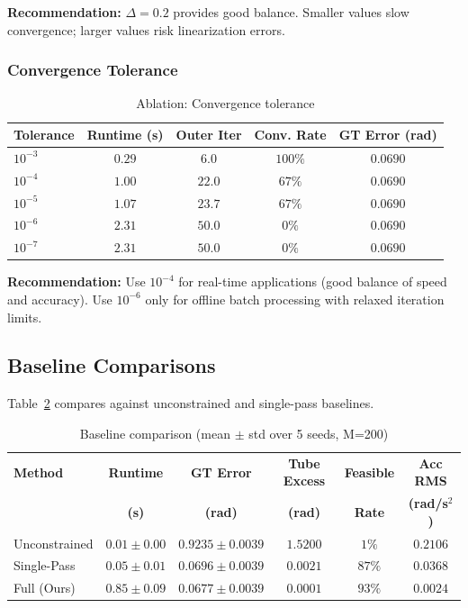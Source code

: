 \textbf{Recommendation:} $\Delta = 0.2$ provides good balance. Smaller values slow convergence; larger values risk linearization errors.

\subsubsection{Convergence Tolerance}

\begin{table}[htbp]
\centering
\caption{Ablation: Convergence tolerance}
\label{tab:ablation_tolerance}
\begin{tabular}{l c c c c}
\hline
\textbf{Tolerance} & \textbf{Runtime (s)} & \textbf{Outer Iter} & \textbf{Conv. Rate} & \textbf{GT Error (rad)} \\
\hline
$10^{-3}$ & $0.29$ & $6.0$ & $100\%$ & $0.0690$ \\
$10^{-4}$ & $1.00$ & $22.0$ & $67\%$ & $0.0690$ \\
$10^{-5}$ & $1.07$ & $23.7$ & $67\%$ & $0.0690$ \\
$10^{-6}$ & $2.31$ & $50.0$ & $0\%$ & $0.0690$ \\
$10^{-7}$ & $2.31$ & $50.0$ & $0\%$ & $0.0690$ \\
\hline
\end{tabular}
\end{table}

\textbf{Recommendation:} Use $10^{-4}$ for real-time applications (good balance of speed and accuracy). Use $10^{-6}$ only for offline batch processing with relaxed iteration limits.

\subsection{Baseline Comparisons}
\label{sec:baselines}

Table~\ref{tab:baseline_comparison} compares against unconstrained and single-pass baselines.

\begin{table}[htbp]
\centering
\caption{Baseline comparison (mean $\pm$ std over 5 seeds, M=200)}
\label{tab:baseline_comparison}
\begin{tabular}{l c c c c c}
\hline
\textbf{Method} & \textbf{Runtime} & \textbf{GT Error} & \textbf{Tube Excess} & \textbf{Feasible} & \textbf{Acc RMS} \\
& \textbf{(s)} & \textbf{(rad)} & \textbf{(rad)} & \textbf{Rate} & \textbf{(rad/s$^2$)} \\
\hline
Unconstrained & $0.01 \pm 0.00$ & $0.9235 \pm 0.0039$ & $1.5200$ & $1\%$ & $0.2106$ \\
Single-Pass & $0.05 \pm 0.01$ & $0.0696 \pm 0.0039$ & $0.0021$ & $87\%$ & $0.0368$ \\
Full (Ours) & $0.85 \pm 0.09$ & $0.0677 \pm 0.0039$ & $0.0001$ & $93\%$ & $0.0024$ \\
\hline
\end{tabular}
\end{table}

